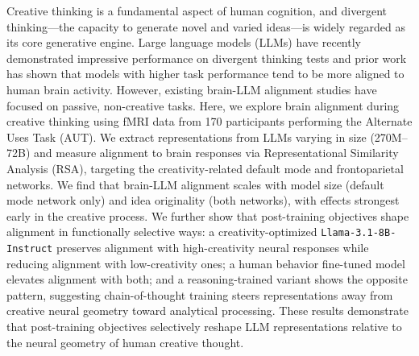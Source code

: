 Creative thinking is a fundamental aspect of human cognition, and divergent thinking—the capacity to generate novel and varied ideas—is widely regarded as its core generative engine. Large language models (LLMs) have recently demonstrated impressive performance on divergent thinking tests and prior work has shown that models with higher task performance tend to be more aligned to human brain activity. However, existing brain-LLM alignment studies have focused on passive, non-creative tasks. Here, we explore brain alignment during creative thinking using fMRI data from 170 participants performing the Alternate Uses Task (AUT). We extract representations from LLMs varying in size (270M–72B) and measure alignment to brain responses via Representational Similarity Analysis (RSA), targeting the creativity-related default mode and frontoparietal networks. We find that brain-LLM alignment scales with model size (default mode network only) and idea originality (both networks), with effects strongest early in the creative process. We further show that post-training objectives shape alignment in functionally selective ways: a creativity-optimized \texttt{Llama-3.1-8B-Instruct} preserves alignment with high-creativity neural responses while reducing alignment with low-creativity ones; a human behavior fine-tuned model elevates alignment with both; and a reasoning-trained variant shows the opposite pattern, suggesting chain-of-thought training steers representations away from creative neural geometry toward analytical processing. These results demonstrate that post-training objectives selectively reshape LLM representations relative to the neural geometry of human creative thought.

